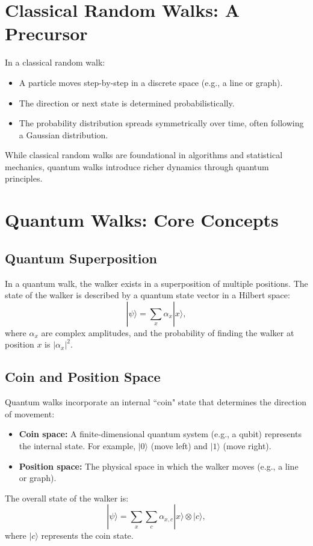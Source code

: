 \documentclass[11pt]{article}
\theoremstyle{definition}
\begin{document}
\section*{Classical Random Walks: A Precursor}
In a classical random walk:
\begin{itemize}
    \item A particle moves step-by-step in a discrete space (e.g., a line or graph).
    \item The direction or next state is determined probabilistically.
    \item The probability distribution spreads symmetrically over time, often following a Gaussian distribution.
\end{itemize}

While classical random walks are foundational in algorithms and statistical mechanics, quantum walks introduce richer dynamics through quantum principles.

\section*{Quantum Walks: Core Concepts}

\subsection*{Quantum Superposition}
In a quantum walk, the walker exists in a superposition of multiple positions. The state of the walker is described by a quantum state vector in a Hilbert space:
\[
|\psi\rangle = \sum_{x} \alpha_x |x\rangle,
\]
where $\alpha_x$ are complex amplitudes, and the probability of finding the walker at position $x$ is $|\alpha_x|^2$.

\subsection*{Coin and Position Space}
Quantum walks incorporate an internal ``coin" state that determines the direction of movement:
\begin{itemize}
    \item \textbf{Coin space:} A finite-dimensional quantum system (e.g., a qubit) represents the internal state. For example, $|0\rangle$ (move left) and $|1\rangle$ (move right).
    \item \textbf{Position space:} The physical space in which the walker moves (e.g., a line or graph).
\end{itemize}
The overall state of the walker is:
\[
|\psi\rangle = \sum_{x} \sum_{c} \alpha_{x,c} |x\rangle \otimes |c\rangle,
\]
where $|c\rangle$ represents the coin state.
\end{document}
